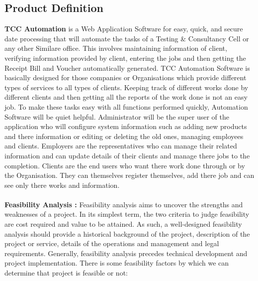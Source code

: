 \subsection{Product Definition}
{\bf TCC Automation} is a Web Application Software for easy, quick, and secure date processing that will automate the tasks of a Testing \& Consultancy Cell or any other Similare office. This involves maintaining information of client, verifying information provided by client, entering the jobs and then getting the Receipt Bill and Voucher automatically generated.
TCC Automation Software is basically designed for those companies or Organisations which provide different types of services to all types of clients. Keeping track of different works done by different clients and then getting all the reports of the work done is not an easy job.
To make these tasks easy with all functions performed quickly, Automation Software will be quiet helpful.
Administrator will be the super user of the application who will configure system information such as adding new products and there information or editing or deleting the old ones, managing employees and clients.
Employers are the representatives who can manage their related information and can update details of their clients and manage there jobs to the completion.
Clients are the end users who want there work done through or by the Organisation. They can themselves register themselves, add there job and can see only there works and information.\\\\
{\bf Feasibility Analysis :}
Feasibility analysis aims to uncover the strengths and weaknesses of a project. In its simplest term, the two criteria to judge feasibility are cost required and value to be attained. As such, a well-designed feasibility analysis should provide a historical background of the project, description of the project or service, details of the operations and management and legal requirements. Generally, feasibility analysis precedes technical development and project implementation. There is some feasibility factors by which we can
determine that project is feasible or not:
